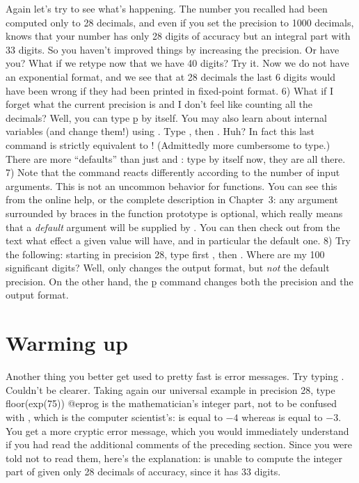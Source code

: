 Again let's try to see what's happening. The number you recalled had been
computed only to 28 decimals, and even if you set the precision to 1000
decimals,  knows that your number has only 28 digits of accuracy but
an integral part with 33 digits. So you haven't improved things by increasing
the precision. Or have you? What if we retype  now that we
have 40 digits? Try it. Now we do not have an exponential format, and we see
that at 28 decimals the last 6 digits would have been wrong if they had been
printed in fixed-point format.
\medskip
%
6) What if I forget what the current precision is and I don't feel like
counting all the decimals? Well, you can type \b{p} by itself. You may also
learn about  internal variables (and change them!) using
. Type , then
. Huh? In fact this last command is strictly
equivalent to ! (Admittedly more cumbersome to type.) There are
more ``defaults'' than just  and : type
 by itself now, they are all there. \smallskip
%
7) Note that the  command reacts differently according to the
number of input arguments. This is not an uncommon behavior for 
functions. You can see this from the online help, or the complete description
in Chapter~3: any argument surrounded by braces \kbd{\obr\cbr} in the
function prototype is optional, which really means that a \emph{default}
argument will be supplied by . You can then check out from the text
what effect a given value will have, and in particular the default one.
\smallskip
%
8) Try the following: starting in precision 28, type first
, then . Where are my 100
significant digits? Well,  only changes the output
format, but \emph{not} the default precision. On the other hand, the \b{p}
command changes both the precision and the output format.

\section{Warming up}

Another thing you better get used to pretty fast is error messages. Try
typing . Couldn't be clearer. Taking again our universal example in
precision 28, type
\bprog
  floor(exp(75))
@eprog\noindent
{} is the mathematician's integer part, not to be confused with
, which is the computer scientist's:  is equal
to $-4$ whereas  is equal to $-3$.  You get a more
cryptic error message, which you would immediately understand if you had read
the additional comments of the preceding section. Since you were told not to
read them, here's the explanation:  is unable to compute the
integer part of  given only 28 decimals of accuracy, since
it has 33 digits.

